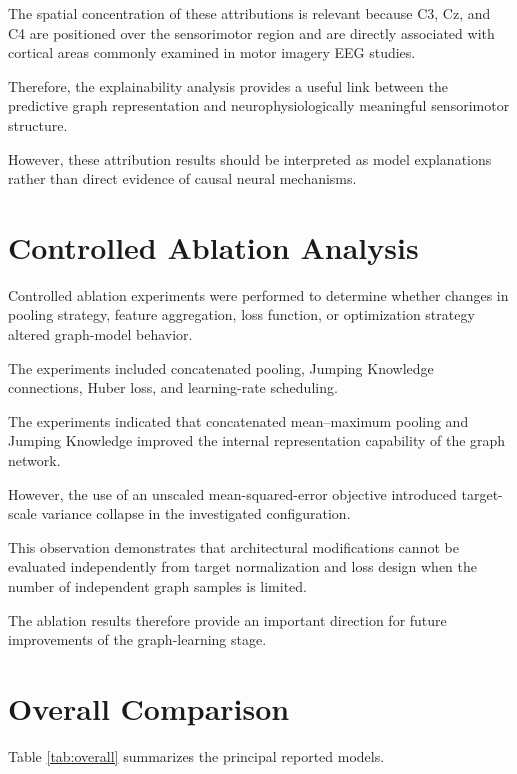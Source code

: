 \documentclass[conference]{IEEEtran}
\begin{document}
The spatial concentration of these attributions is relevant because C3, Cz, and C4 are positioned over the sensorimotor region and are directly associated with cortical areas commonly examined in motor imagery EEG studies.

Therefore, the explainability analysis provides a useful link between the predictive graph representation and neurophysiologically meaningful sensorimotor structure.

However, these attribution results should be interpreted as model explanations rather than direct evidence of causal neural mechanisms.

\section{Controlled Ablation Analysis}
Controlled ablation experiments were performed to determine whether changes in pooling strategy, feature aggregation, loss function, or optimization strategy altered graph-model behavior.

The experiments included concatenated pooling, Jumping Knowledge connections, Huber loss, and learning-rate scheduling.

The experiments indicated that concatenated mean--maximum pooling and Jumping Knowledge improved the internal representation capability of the graph network.

However, the use of an unscaled mean-squared-error objective introduced target-scale variance collapse in the investigated configuration.

This observation demonstrates that architectural modifications cannot be evaluated independently from target normalization and loss design when the number of independent graph samples is limited.

The ablation results therefore provide an important direction for future improvements of the graph-learning stage.

\section{Overall Comparison}
Table \ref{tab:overall} summarizes the principal reported models.
\end{document}
